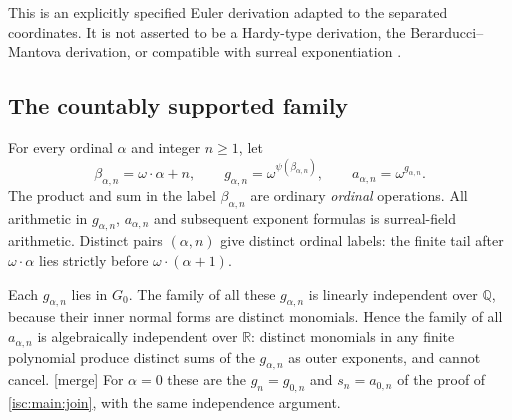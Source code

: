 \documentclass[11pt,letterpaper]{article}
\theoremstyle{definition}
\theoremstyle{remark}
\newcommand{\R}{\mathbb R}
\newcommand{\Q}{\mathbb Q}
\newcommand{\mtag}{\textup{[merge]}}%
\numberwithin{equation}{section}
\begin{document}
This is an explicitly specified Euler derivation adapted to the separated
coordinates. It is not asserted to be a Hardy-type derivation, the
Berarducci--Mantova derivation, or compatible with surreal exponentiation
\cite{KM,BM}.

\subsection{The countably supported family}

For every ordinal $\alpha$ and integer $n\ge1$, let
\begin{equation}\label{isc:cp:eq:labels}
 \beta_{\alpha,n}=\omega\cdot\alpha+n,
 \qquad g_{\alpha,n}=\omega^{\psi(\beta_{\alpha,n})},
 \qquad a_{\alpha,n}=\omega^{g_{\alpha,n}}.
\end{equation}
The product and sum in the label $\beta_{\alpha,n}$ are ordinary
\emph{ordinal} operations. All arithmetic in $g_{\alpha,n}$, $a_{\alpha,n}$
and subsequent exponent formulas is surreal-field arithmetic. Distinct pairs
$(\alpha,n)$ give distinct ordinal labels: the finite tail after
$\omega\cdot\alpha$ lies strictly before $\omega\cdot(\alpha+1)$.

Each $g_{\alpha,n}$ lies in $G_0$. The family of all these $g_{\alpha,n}$ is
linearly independent over $\Q$, because their inner normal forms are
distinct monomials. Hence the family of all $a_{\alpha,n}$ is algebraically
independent over $\R$: distinct monomials in any finite polynomial produce
distinct sums of the $g_{\alpha,n}$ as outer exponents, and cannot cancel.
\mtag{} For $\alpha=0$ these are the $g_n=g_{0,n}$ and $s_n=a_{0,n}$ of the
proof of \cref{isc:main:join}, with the same independence argument.
\end{document}
